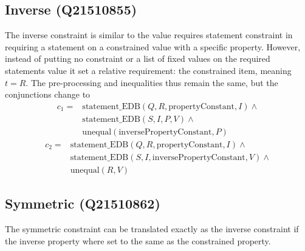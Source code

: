 \documentclass[hyperref,bachelorofscience,fleqn]{cgvpub}
\begin{document}
\subsection{Inverse (Q21510855)}
The inverse constraint is similar to the value requires statement constraint in requiring a statement on a constrained value with a specific property. However, instead of putting no constraint or a list of fixed values on the required statements value it set a relative requirement: the constrained item, meaning \(t = R\). The pre-processing and inequalities thus remain the same, but the conjunctions change to 
\begin{equation*}
\begin{split}
c_1 = &\text{statement\_EDB}(Q, R, \text{propertyConstant}, I) \wedge{} \\
&\text{statement\_EDB}(S, I, P, V) \wedge{} \\
&\text{unequal}(\text{inversePropertyConstant}, P)
\end{split}
\end{equation*}
\begin{equation*}
\begin{split}
c_2 = &\text{statement\_EDB}(Q, R, \text{propertyConstant}, I) \wedge{} \\
&\text{statement\_EDB}(S, I, \text{inversePropertyConstant}, V) \wedge{} \\
&\text{unequal}(R, V)
\end{split}
\end{equation*}

\subsection{Symmetric (Q21510862)}
The symmetric constraint can be translated exactly as the inverse constraint if the inverse property where set to the same as the constrained property.
\end{document}
